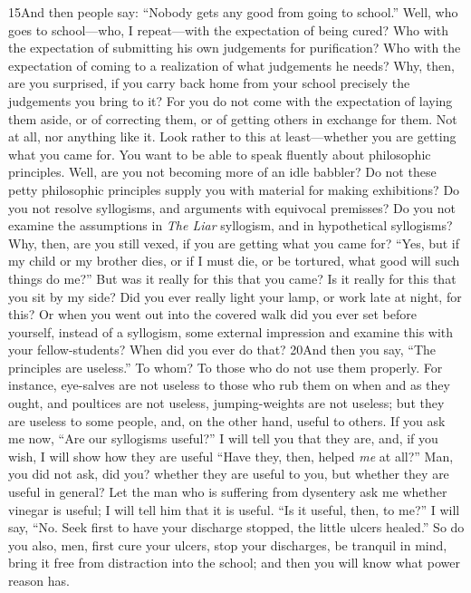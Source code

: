 15And then people say: ``Nobody gets any good from going to school.'' Well, who goes to school—who, I repeat—with the expectation of being cured? Who with the expectation of submitting his own judgements for purification? Who with the expectation of coming to a realization of what judgements he needs? Why, then, are you surprised, if you carry back home from your school precisely the judgements you bring to it? For you do not come with the expectation of laying them aside, or of correcting them, or of getting others in exchange for them. Not at all, nor anything like it. Look rather to this at least—whether you are getting what you came for. You want to be able to speak fluently about philosophic principles. Well, are you not becoming more of an idle babbler? Do not these petty philosophic principles supply you with material for making exhibitions? Do you not resolve syllogisms, and arguments with equivocal premisses? Do you not examine the assumptions in \emph{The Liar} syllogism, and in hypothetical syllogisms? Why, then, are you still vexed, if you are getting what you came for? ``Yes, but if my child or my brother dies, or if I must die, or be tortured, what good will such things do me?'' But was it really for this that you came? Is it really for this that you sit by my side? Did you ever really light your lamp, or work late at night, for this? Or when you went out into the covered walk did you ever set before yourself, instead of a syllogism, some external impression and examine this with your fellow-students? When did you ever do that? 20And then you say, ``The principles are useless.'' To whom? To those who do not use them properly. For instance, eye-salves are not useless to those who rub them on when and as they ought, and poultices are not useless, jumping-weights are not useless; but they are useless to some people, and, on the other hand, useful to others. If you ask me now, ``Are our syllogisms useful?'' I will tell you that they are, and, if you wish, I will show how they are useful ``Have they, then, helped \emph{me} at all?'' Man, you did not ask, did you? whether they are useful to you, but whether they are useful in general? Let the man who is suffering from dysentery ask me whether vinegar is useful; I will tell him that it is useful. ``Is it useful, then, to me?'' I will say, ``No. Seek first to have your discharge stopped, the little ulcers healed.'' So do you also, men, first cure your ulcers, stop your discharges, be tranquil in mind, bring it free from distraction into the school; and then you will know what power reason has.

